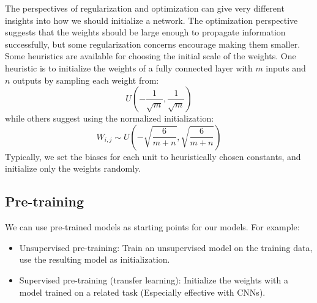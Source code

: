 The perspectives of regularization and optimization can give very different insights into how we should initialize a network. The optimization perspective suggests that the weights should be large enough to propagate information successfully, but some regularization concerns encourage making them smaller.\newline\newline
Some heuristics are available for choosing the initial scale of the weights. One heuristic is to initialize the weights of a fully connected layer with $m$ inputs and $n$ outputs by sampling each weight from:
\[U(-\frac{1}{\sqrt{m}}, \frac{1}{\sqrt{m}})\]
while others suggest using the normalized initialization:
\[W_{i,j} \sim U\left( -\sqrt{\frac{6}{m + n}}, \sqrt{\frac{6}{m + n}}   \right)\]
Typically, we set the biases for each unit to heuristically chosen constants, and initialize only the weights randomly.
\subsection{Pre-training}
We can use pre-trained models as starting points for our models. For example:
\begin{itemize}
    \item Unsupervised pre-training: Train an unsupervised model on the training data, use the resulting model as initialization.

    \item Supervised pre-training (transfer learning): Initialize the weights with a model trained on a related task (Especially effective with CNNs).
\end{itemize}

